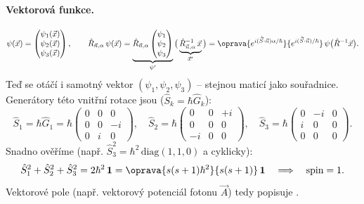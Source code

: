 \paragraph{Vektorová funkce.}
\[
  \psi(\vec x) = \begin{pmatrix} \psi_1(\vec x)\\ \psi_2(\vec x)\\ \psi_3(\vec x)\end{pmatrix},
  \qquad
  \hat R_{\vec n,\alpha}\,\psi(\vec x)
  = \underbrace{\hat R_{\vec n,\alpha}\begin{pmatrix}\psi_1\\ \psi_2\\ \psi_3\end{pmatrix}}_{\psi'}
    \big(\underbrace{\hat R^{-1}_{\vec n,\alpha}\,\vec x}_{\vec x'}\big)
  = \oprava{e^{i(\hat{\vec S}\cdot\vec n)\alpha/\hbar}}{e^{i(\hat{\vec S}\cdot\vec n)/\hbar}}\,\psi\big(\hat R^{-1}\vec x\big).
\]
Teď se otáčí i samotný vektor \((\psi_1,\psi_2,\psi_3)\) – stejnou maticí jako
souřadnice. Generátory této vnitřní rotace jsou (\(\hat S_k = \hbar\hat G_k\)):
\[
  \hat S_1 = \hbar\hat G_1 = \hbar\begin{pmatrix} 0&0&0\\ 0&0&-i\\ 0&i&0\end{pmatrix},\quad
  \hat S_2 = \hbar\begin{pmatrix} 0&0&+i\\ 0&0&0\\ -i&0&0\end{pmatrix},\quad
  \hat S_3 = \hbar\begin{pmatrix} 0&-i&0\\ i&0&0\\ 0&0&0\end{pmatrix}.
\]
Snadno ověříme (např. \(\hat S_3^2 = \hbar^2\,\mathrm{diag}(1,1,0)\) a cyklicky):
\[
  \hat S_1^2 + \hat S_2^2 + \hat S_3^2 = 2\hbar^2\,\mathbf{1}
  = \oprava{s(s+1)\hbar^2}{s(s+1)}\,\mathbf{1}
  \quad\Longrightarrow\quad \text{spin} = 1 .
\]
Vektorové pole (např. vektorový potenciál fotonu \(\vec A\)) tedy popisuje
.

